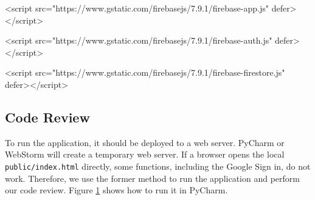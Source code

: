 \documentclass[12pt, a4paper]{article}
\newcommand{\code}[1]{\texttt{#1}}
\begin{document}
  <script src="https://www.gstatic.com/firebasejs/7.9.1/firebase-app.js" defer></script>
  
  <script src="https://www.gstatic.com/firebasejs/7.9.1/firebase-auth.js" defer></script>
  
  <script src="https://www.gstatic.com/firebasejs/7.9.1/firebase-firestore.js" defer></script>
  

\subsection{Code Review}
To run the application, it should be deployed to a web server. PyCharm or WebStorm will create a temporary web server. If a browser opens the local \code{public/index.html} directly, some functions, including the Google Sign in, do not work. Therefore, we use the former method to run the application and perform our code review. Figure \ref{fig:run} shows how to run it in PyCharm.

\begin{figure}
\centering
{}
\label{fig:run}
\end{figure}
\end{document}
